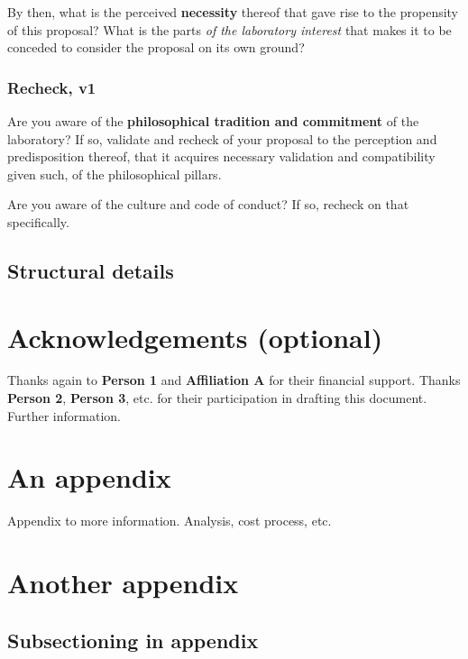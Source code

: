 \documentclass[10pt,a4paper]{article}
\begin{document}
By then, what is the perceived \textbf{necessity} thereof that gave rise to the propensity of this proposal? What is the parts \textit{of the laboratory interest} that makes it to be conceded to consider the proposal on its own ground? 

\subsubsection{Recheck, v1}

Are you aware of the \textbf{philosophical tradition and commitment} of the laboratory? If so, validate and recheck of your proposal to the perception and predisposition thereof, that it acquires necessary validation and compatibility given such, of the philosophical pillars. 

Are you aware of the culture and code of conduct? If so, recheck on that specifically. 

\subsection{Structural details}



\clearpage

\section*{Acknowledgements (optional)}

Thanks again to \textbf{Person 1} and \textbf{Affiliation A} for their financial support. Thanks \textbf{Person 2}, \textbf{Person 3}, etc. for their participation in drafting this document. Further information. 


% 
% 

\appendix

\section{An appendix}

Appendix to more information. Analysis, cost process, etc. 

\section{Another appendix}

\subsection*{Subsectioning in appendix}
\end{document}
